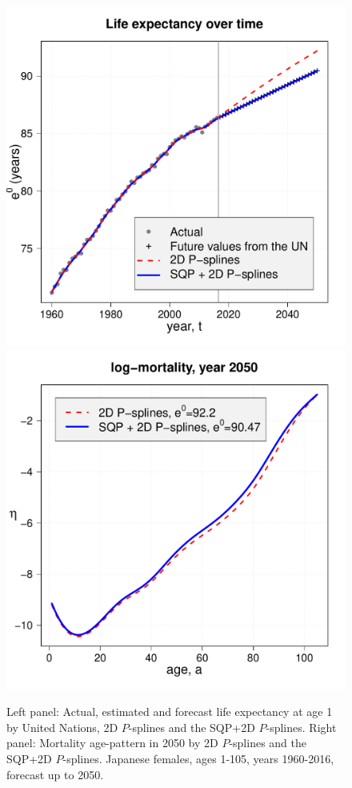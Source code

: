 \documentclass[twoside]{report}
\begin{document}
\begin{figure}[!ht]\centering
	\includegraphics[scale=0.25]{CamardaE0.pdf}
	\includegraphics[scale=0.25]{CamardaMort2050.pdf}
	\caption{\label{fig:CamardaMort} Left panel: Actual, estimated and forecast life expectancy at age 1 by United Nations, 2D $P$-splines and the SQP+2D $P$-splines. Right panel: Mortality age-pattern in 2050 by 2D $P$-splines and the SQP+2D $P$-splines. Japanese females, ages 1-105, years 1960-2016, forecast up to 2050.}
\end{figure}
\end{document}

